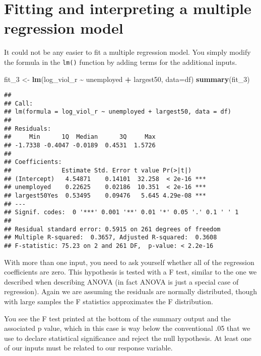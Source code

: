 \documentclass[
]{book}
\newenvironment{Shaded}{\begin{snugshade}}{\end{snugshade}}
\newcommand{\AttributeTok}[1]{\textcolor[rgb]{0.13,0.29,0.53}{#1}}
\newcommand{\FunctionTok}[1]{\textcolor[rgb]{0.13,0.29,0.53}{\textbf{#1}}}
\newcommand{\NormalTok}[1]{#1}
\newcommand{\OtherTok}[1]{\textcolor[rgb]{0.56,0.35,0.01}{#1}}
\newcommand{\SpecialCharTok}[1]{\textcolor[rgb]{0.81,0.36,0.00}{\textbf{#1}}}
\begin{document}
\section{Fitting and interpreting a multiple regression model}\label{fitting-and-interpreting-a-multiple-regression-model}

It could not be any easier to fit a multiple regression model. You simply modify the formula in the \texttt{lm()} function by adding terms for the additional inputs.

\begin{Shaded}
\begin{Highlighting}[]
\NormalTok{fit\_3 }\OtherTok{\textless{}{-}} \FunctionTok{lm}\NormalTok{(log\_viol\_r }\SpecialCharTok{\textasciitilde{}}\NormalTok{ unemployed }\SpecialCharTok{+}\NormalTok{ largest50, }\AttributeTok{data=}\NormalTok{df)}
\FunctionTok{summary}\NormalTok{(fit\_3)}
\end{Highlighting}
\end{Shaded}

\begin{verbatim}
## 
## Call:
## lm(formula = log_viol_r ~ unemployed + largest50, data = df)
## 
## Residuals:
##     Min      1Q  Median      3Q     Max 
## -1.7338 -0.4047 -0.0189  0.4531  1.5726 
## 
## Coefficients:
##              Estimate Std. Error t value Pr(>|t|)    
## (Intercept)   4.54871    0.14101  32.258  < 2e-16 ***
## unemployed    0.22625    0.02186  10.351  < 2e-16 ***
## largest50Yes  0.53495    0.09476   5.645 4.29e-08 ***
## ---
## Signif. codes:  0 '***' 0.001 '**' 0.01 '*' 0.05 '.' 0.1 ' ' 1
## 
## Residual standard error: 0.5915 on 261 degrees of freedom
## Multiple R-squared:  0.3657, Adjusted R-squared:  0.3608 
## F-statistic: 75.23 on 2 and 261 DF,  p-value: < 2.2e-16
\end{verbatim}

With more than one input, you need to ask yourself whether all of the regression coefficients are zero. This hypothesis is tested with a F test, similar to the one we described when describing ANOVA (in fact ANOVA is just a special case of regression). Again we are assuming the residuals are normally distributed, though with large samples the F statistics approximates the F distribution.

You see the F test printed at the bottom of the summary output and the associated p value, which in this case is way below the conventional .05 that we use to declare statistical significance and reject the null hypothesis. At least one of our inputs must be related to our response variable.
\end{document}
